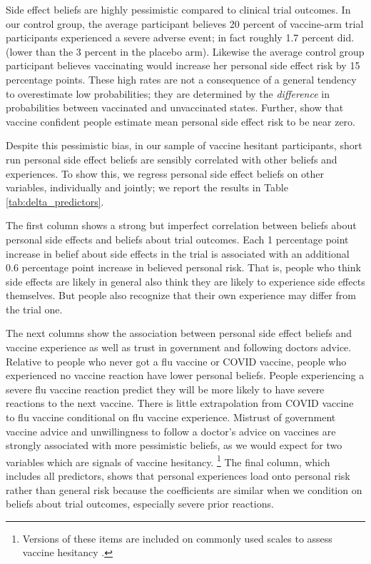 Side effect beliefs are highly pessimistic compared to clinical trial outcomes.
In our control group, the average participant believes 20 percent of vaccine-arm trial 
participants experienced a severe adverse event;
in fact roughly 1.7 percent did. (lower than the 3 percent in the placebo arm). 
Likewise the average control group participant believes 
vaccinating would increase her personal side effect risk by 15 percentage points. These high 
rates are not a consequence of a general tendency to overestimate low probabilities;
they are determined by the {\em difference} in probabilities between vaccinated and 
unvaccinated states. Further, \citet{sacks2025preferences} show that vaccine confident
people estimate mean personal side effect risk to be near zero. 

Despite this pessimistic bias, in our sample of vaccine hesitant participants, 
short run personal side effect beliefs are sensibly 
correlated with other beliefs and experiences. To show this, we regress personal side effect beliefs on other variables, individually and jointly; we report the results in Table 
\ref{tab:delta_predictors}.

The first column shows a strong but imperfect correlation between beliefs about 
personal side effects and beliefs about trial outcomes. Each 1 percentage point increase
in belief about side effects in the trial is associated with an additional 0.6 percentage 
point increase in believed personal risk. That is, people who think side effects are likely 
in general  also  think they are likely to experience side effects themselves. But people 
also recognize that their own experience may differ from the trial one. 

The next columns show the association between personal side effect beliefs
and vaccine experience as well as trust in government and following doctors advice. 
Relative to people who never got a flu vaccine or COVID vaccine, 
people who experienced no vaccine reaction have lower personal beliefs. People experiencing 
a severe flu vaccine reaction predict they will be more likely to have severe reactions 
to the next vaccine. There is little extrapolation from COVID vaccine
to flu vaccine conditional on flu vaccine experience.
Mistrust of government vaccine advice and unwillingness to follow a doctor's advice on
vaccines are strongly associated with more pessimistic beliefs, as we would expect for 
two variables which are signals of vaccine hesitancy.%
\footnote{Versions of these items are included on commonly used scales to assess 
vaccine hesitancy \citep{larson2015measuring}.}
The final column, which includes all predictors, shows that personal experiences load onto 
personal risk rather than general risk because the coefficients are similar when we condition 
on beliefs about trial outcomes, especially severe prior reactions. 

